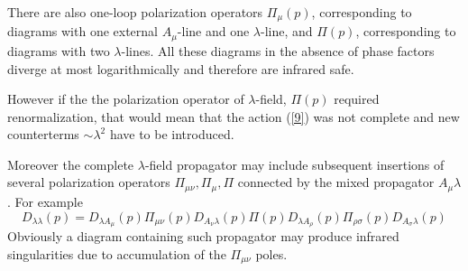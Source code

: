 \documentclass[a4paper,12pt]{article}
\begin{document}
There are also one-loop polarization operators $\Pi_{\mu}(p)$, 
corresponding to diagrams with one external $A_{\mu}$-line and one 
$\lambda$-line, and  $\Pi(p)$, corresponding to diagrams with two 
$\lambda$-lines. All these diagrams in the absence of phase factors 
diverge at most logarithmically and therefore are infrared safe.

 However if the the polarization operator of $\lambda$-field, $\Pi(p)$ 
required renormalization, that would mean that the action (\ref{9}) was not 
complete and new counterterms $\sim \lambda^2$ have to be introduced.

Moreover the complete $\lambda$-field propagator may include subsequent 
 insertions of several polarization operators $\Pi_{\mu \nu}, \Pi_{\mu}, 
\Pi$ connected by the mixed propagator $A_{\mu} \lambda$. For example
\begin{equation}
D_{\lambda \lambda}(p)=D_{\lambda A_{\mu}}(p) \Pi_{\mu \nu}(p)D_{A_{\nu} 
\lambda}(p) \Pi(p)D_{\lambda A_{\rho}}(p) \Pi_{\rho 
\sigma}(p)D_{A_{\sigma} \lambda}(p) \label{23b} \end{equation} Obviously 
a diagram containing such propagator may produce infrared singularities 
 due to accumulation of the $\Pi_{\mu \nu}$ poles.
\end{document}

